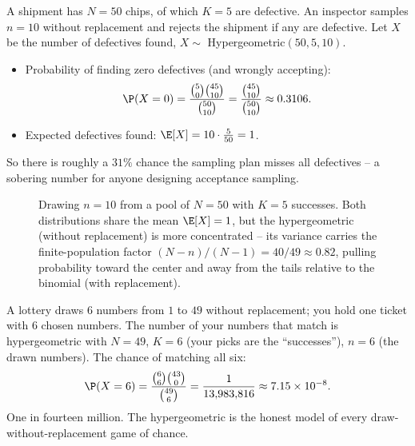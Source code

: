 \begin{example}
\label{ch07:ex-qc}
A shipment has $N = 50$ chips, of which $K = 5$ are defective. An inspector samples
$n = 10$ without replacement and rejects the shipment if any are defective. Let
$X$ be the number of defectives found, $X \sim$ Hypergeometric$(50, 5, 10)$.
\begin{itemize}
\item Probability of finding zero defectives (and wrongly accepting):
  \[
    \P(X = 0) = \frac{\binom{5}{0}\binom{45}{10}}{\binom{50}{10}}
    = \frac{\binom{45}{10}}{\binom{50}{10}} \approx 0.3106.
  \]
\item Expected defectives found: $\E[X] = 10 \cdot \tfrac{5}{50} = 1$.
\end{itemize}
So there is roughly a $31\%$ chance the sampling plan misses all defectives -- a
sobering number for anyone designing acceptance sampling.
\end{example}

\begin{figure}[H]
\centering
{}
\caption{Drawing $n=10$ from a pool of $N=50$ with $K=5$ successes. Both
distributions share the mean $\E[X]=1$, but the hypergeometric (without
replacement) is more concentrated -- its variance carries the finite-population
factor $(N-n)/(N-1)=40/49\approx 0.82$, pulling probability toward the center and
away from the tails relative to the binomial (with replacement).}
\label{ch07:fig-hyper-pmf}
\end{figure}

\begin{example}[Lottery]
\label{ch07:ex-lottery}
A lottery draws $6$ numbers from $1$ to $49$ without replacement; you hold one
ticket with $6$ chosen numbers. The number of your numbers that match is
hypergeometric with $N = 49$, $K = 6$ (your picks are the ``successes''), $n = 6$
(the drawn numbers). The chance of matching all six:
\[
  \P(X = 6) = \frac{\binom{6}{6}\binom{43}{0}}{\binom{49}{6}}
  = \frac{1}{13{,}983{,}816} \approx 7.15 \times 10^{-8}.
\]
One in fourteen million. The hypergeometric is the honest model of every
draw-without-replacement game of chance.
\end{example}

